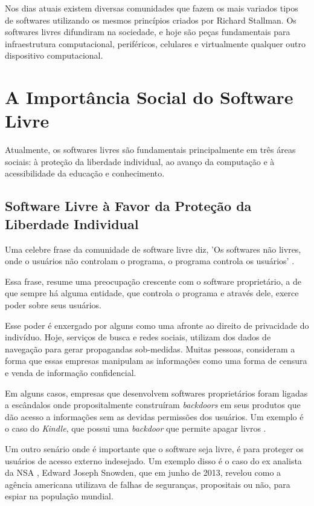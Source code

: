 Nos dias atuais existem diversas comunidades que fazem os mais variados tipos de softwares utilizando os mesmos princípios criados por Richard Stallman. Os softwares livres difundiram na sociedade, e hoje são peças fundamentais para infraestrutura computacional, periféricos, celulares e virtualmente qualquer outro dispositivo computacional.

\section{A Importância Social do Software Livre}
Atualmente, os softwares livres são fundamentais principalmente em três áreas sociais: à proteção da liberdade individual, ao avanço da computação e à acessibilidade da educação e conhecimento.

\subsection{Software Livre à Favor da Proteção da Liberdade Individual}
Uma celebre frase da comunidade de software livre diz, 'Os softwares não livres, onde o usuários não controlam o programa, o programa controla os usuários' \cite{Williams}. 

Essa frase, resume uma preocupação crescente com o software proprietário, a de que sempre há   alguma entidade, que controla o programa e através dele, exerce poder sobre seus usuários. 

Esse poder é enxergado por alguns como uma afronte ao direito de privacidade do indivíduo. Hoje, serviços de busca e redes sociais, utilizam dos dados de navegação para gerar propagandas sob-medidas.  Muitas pessoas, consideram a forma que essas empresas manipulam as informações como uma forma de censura e venda de informação confidencial. 

Em alguns casos, empresas que desenvolvem softwares proprietários foram ligadas a escândalos onde propositalmente construíram \textit{backdoors} em seus produtos que dão acesso a informações sem as devidas permissões dos usuários. Um exemplo é o caso do \textit{ Kindle}, que possui uma \textit{backdoor} que permite apagar livros \cite{GNUOperatingSystem} .

Um outro senário onde é importante que o software seja livre, é para proteger os usuários de acesso externo indesejado. Um exemplo disso é o caso do ex analista da NSA \cite{Tate2013}, Edward Joseph Snowden, que em junho de 2013, revelou como a agência americana utilizava de falhas de seguranças, propositais ou não, para espiar na população mundial. 

